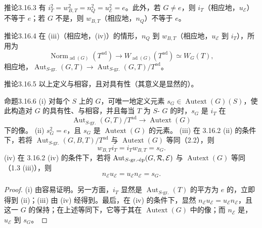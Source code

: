 \begin{SGAresult}{推论}{3.16.3}
有 $i_T^2=w_{B,T}^2=n_Q^2=u_{\mathcal E}^2=e$。此外，若 $G\ne e$，则 $i_T$（相应地，$u_{\mathcal E}$）不等于 $e$；若 $G$ 不是，则 $w_{B,T}$（相应地，$n_Q$）不等于 $e$。
\end{SGAresult}
\begin{SGAresult}{推论}{3.16.4}
在 (iii)（相应地，(iv)）的情形，$n_Q$ 到 $w_{B,T}$（相应地，$u_{\mathcal E}$ 到 $i_T$），所用为
\[\operatorname{Norm}_{\operatorname{ad}(G)}(T^{\mathrm{ad}})\longrightarrow W_{\operatorname{ad}(G)}(T^{\mathrm{ad}})\simeq W_G(T),\]
相应地，$\operatorname{Aut}_{S\text{-gr.}}(G,T)\to\operatorname{Aut}_{S\text{-gr.}}(G,T)/T^{\mathrm{ad}}$。
\end{SGAresult}
\begin{SGAresult}{推论}{3.16.5}
以上定义与相容，且对具有性（其意义是显然的）。
\end{SGAresult}
\begin{SGAresult}{命题}{3.16.6}
(i) 对每个 $S$ 上的 $G$，可唯一地定义元素 $s_G\in\operatorname{Autext}(G)(S)$，使此构造对 $G$ 的具有性、与相容，并且每当 $T$ 为 $S$- $G$ 的时，$s_G$ 是 $i_T$ 在
\[\operatorname{Aut}_{S\text{-gr.}}(G,T)/T^{\mathrm{ad}}\longrightarrow\operatorname{Autext}(G)\]
下的像。
(ii) $s_G^2=e$，且 $s_G$ 是 $\operatorname{Autext}(G)$ 的元素。
(iii) 在 3.16.2 (ii) 的条件下，若将 $\operatorname{Aut}_{S\text{-gr.}}(G,B,T)/T^{\mathrm{ad}}$ 与 $\operatorname{Autext}(G)$ 等同（2.2），则
\[w_{B,T}i_T=i_Tw_{B,T}=s_G.\]
(iv) 在 3.16.2 (iv) 的条件下，若将 $\operatorname{Aut}_{S\text{-gr.\text{-}ép}}(G,\mathcal R,\mathcal E)$ 与 $\operatorname{Autext}(G)$ 等同（1.3 (iii)），则
\[n_{\mathcal E}u_{\mathcal E}=u_{\mathcal E}n_{\mathcal E}=s_G.\]
\end{SGAresult}
\begin{proof}
(i) 由容易证明。另一方面，$i_T$ 显然是 $\operatorname{Aut}_{S\text{-gr.}}(T)$ 的平方为 $e$ 的，立即得到 (ii)；(iii) 由 (iv) 经得到。最后，在 (iv) 的条件下，显然 $n_{\mathcal E}u_{\mathcal E}=u_{\mathcal E}n_{\mathcal E}$，且这一 $G$ 的保持；在上述等同下，它等于其在 $\operatorname{Autext}(G)$ 中的像；而 $n_{\mathcal E}$ 是，$u_{\mathcal E}$ 到 $s_G$。
\end{proof}
